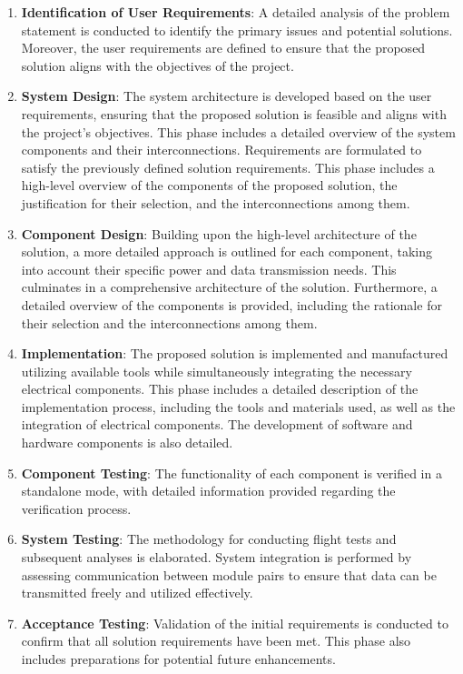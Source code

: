 \begin{enumerate}
  \item \textbf{Identification of User Requirements}: A detailed analysis of the problem statement is conducted to identify the primary issues and potential solutions. Moreover, the user requirements are defined to ensure that the proposed solution aligns with the objectives of the project.

  \item \textbf{System Design}: The system architecture is developed based on the user requirements, ensuring that the proposed solution is feasible and aligns with the project's objectives. This phase includes a detailed overview of the system components and their interconnections. Requirements are formulated to satisfy the previously defined solution requirements. This phase includes a high-level overview of the components of the proposed solution, the justification for their selection, and the interconnections among them.

  \item \textbf{Component Design}: Building upon the high-level architecture of the solution, a more detailed approach is outlined for each component, taking into account their specific power and data transmission needs. This culminates in a comprehensive architecture of the solution. Furthermore, a detailed overview of the components is provided, including the rationale for their selection and the interconnections among them.

  \item \textbf{Implementation}: The proposed solution is implemented and manufactured utilizing available tools while simultaneously integrating the necessary electrical components. This phase includes a detailed description of the implementation process, including the tools and materials used, as well as the integration of electrical components. The development of software and hardware components is also detailed.

  \item \textbf{Component Testing}: The functionality of each component is verified in a standalone mode, with detailed information provided regarding the verification process.

  \item \textbf{System Testing}: The methodology for conducting flight tests and subsequent analyses is elaborated. System integration is performed by assessing communication between module pairs to ensure that data can be transmitted freely and utilized effectively.

  \item \textbf{Acceptance Testing}: Validation of the initial requirements is conducted to confirm that all solution requirements have been met. This phase also includes preparations for potential future enhancements.
\end{enumerate}

